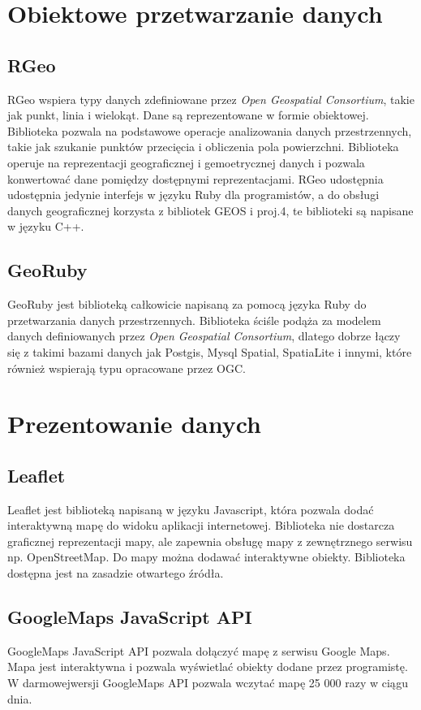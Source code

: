\documentclass[printmode]{mgr}
\begin{document}
\section{Obiektowe przetwarzanie danych}
\subsection{RGeo}
RGeo wspiera typy danych zdefiniowane przez \textit{Open Geospatial Consortium}, takie jak punkt, linia i wielokąt. Dane są reprezentowane w formie obiektowej. Biblioteka pozwala na podstawowe operacje analizowania danych przestrzennych, takie jak szukanie punktów przecięcia i obliczenia pola powierzchni. Biblioteka operuje na reprezentacji geograficznej i gemoetrycznej danych i pozwala konwertować dane pomiędzy dostępnymi reprezentacjami. RGeo udostępnia udostępnia jedynie interfejs w języku Ruby dla programistów, a do obsługi danych geograficznej korzysta z bibliotek GEOS i proj.4, te biblioteki są napisane w języku C++.

\subsection{GeoRuby}
GeoRuby jest biblioteką całkowicie napisaną za pomocą języka Ruby do przetwarzania danych przestrzennych. Biblioteka ściśle podąża za modelem danych definiowanych przez \textit{Open Geospatial Consortium}, dlatego dobrze łączy się z takimi bazami danych jak Postgis, Mysql Spatial, SpatiaLite i innymi, które również wspierają typu opracowane przez OGC\cite{doc_georuby}.

\section{Prezentowanie danych}
\label{sec:maps-tools}
\subsection{Leaflet}
Leaflet jest biblioteką napisaną w języku Javascript, która pozwala dodać interaktywną mapę do widoku aplikacji internetowej. Biblioteka nie dostarcza graficznej reprezentacji mapy, ale zapewnia obsługę mapy z zewnętrznego serwisu np. OpenStreetMap. Do mapy można dodawać interaktywne obiekty. Biblioteka dostępna jest na zasadzie otwartego źródła.\cite{doc_leaflet}

\subsection{GoogleMaps JavaScript API}
GoogleMaps JavaScript API pozwala dołączyć mapę z serwisu Google Maps. Mapa jest interaktywna i pozwala wyświetlać obiekty dodane przez programistę. W darmowejwersji GoogleMaps API pozwala wczytać mapę 25 000 razy w ciągu dnia.\cite{doc_google}
\end{document}
